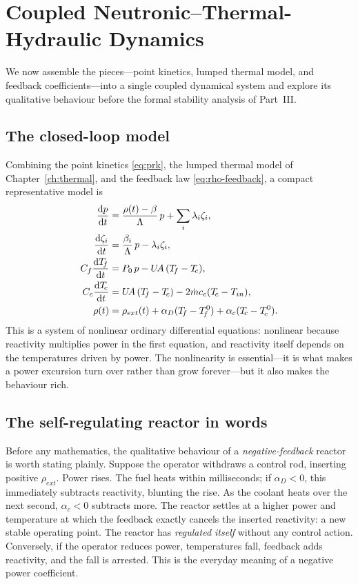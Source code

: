\chapter{Coupled Neutronic--Thermal-Hydraulic Dynamics}
\label{ch:coupled}

We now assemble the pieces---point kinetics, lumped thermal model, and feedback
coefficients---into a single coupled dynamical system and explore its qualitative
behaviour before the formal stability analysis of Part~III.

\section{The closed-loop model}

Combining the point kinetics \eqref{eq:prk}, the lumped thermal model of
Chapter~\ref{ch:thermal}, and the feedback law \eqref{eq:rho-feedback}, a compact
representative model is
\begin{align}
\frac{\dd p}{\dd t} &= \frac{\rho(t)-\beta}{\Lambda}\,p + \sum_i \lambda_i \zeta_i,\\
\frac{\dd \zeta_i}{\dd t} &= \frac{\beta_i}{\Lambda}\,p - \lambda_i \zeta_i,\\
C_f\frac{\dd \Tf}{\dd t} &= P_0\,p - U\!A\,(\Tf-\Tc),\\
C_c\frac{\dd \Tc}{\dd t} &= U\!A\,(\Tf-\Tc) - 2\dot m c_c(\Tc-T_{in}),\\
\rho(t) &= \rho_{ext}(t) + \alpha_D(\Tf-\Tf^0) + \alpha_c(\Tc-\Tc^0).
\end{align}
This is a system of nonlinear ordinary differential equations: nonlinear because
reactivity multiplies power in the first equation, and reactivity itself depends
on the temperatures driven by power. The nonlinearity is essential---it is what
makes a power excursion turn over rather than grow forever---but it also makes the
behaviour rich.

\section{The self-regulating reactor in words}

Before any mathematics, the qualitative behaviour of a \emph{negative-feedback}
reactor is worth stating plainly. Suppose the operator withdraws a control rod,
inserting positive $\rho_{ext}$. Power rises. The fuel heats within milliseconds;
if $\alpha_D<0$, this immediately subtracts reactivity, blunting the rise. As the
coolant heats over the next second, $\alpha_c<0$ subtracts more. The reactor
settles at a higher power and temperature at which the feedback exactly cancels
the inserted reactivity: a new stable operating point. The reactor has
\emph{regulated itself} without any control action. Conversely, if the operator
reduces power, temperatures fall, feedback adds reactivity, and the fall is
arrested. This is the everyday meaning of a negative power coefficient.

